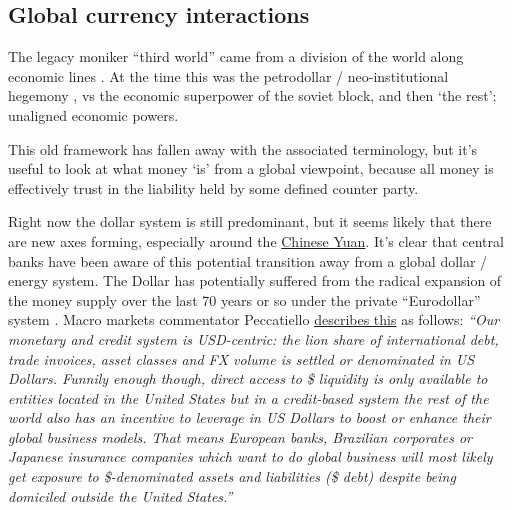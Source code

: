 \subsection{Global currency interactions}
The legacy moniker ``third world'' came from a division of the world along economic lines \cite{tomlinson2003third}. At the time this was the petrodollar / neo-institutional hegemony \cite{caballero2008financial, spiro2019hidden}, vs the economic superpower of the soviet block, and then `the rest'; unaligned economic powers.\par
This old framework has fallen away with the associated terminology, but it's useful to look at what money `is' from a global viewpoint, because all money is effectively trust in the liability held by some defined counter party.\par
Right now the dollar system is still predominant, but it seems likely that there are new axes forming, especially around the \href{https://www.wsj.com/articles/saudi-arabia-considers-accepting-yuan-instead-of-dollars-for-chinese-oil-sales-11647351541}{Chinese Yuan}. It's clear that central banks have been aware of this potential transition away from a global dollar / energy system. The Dollar has potentially suffered from the radical expansion of the money supply over the last 70 years or so under the private ``Eurodollar'' system \cite{grewal2020struggling}. Macro markets commentator Peccatiello \href{https://themacrocompass.substack.com/p/usd-hidden-debt#details}{describes this} as follows: \textit{``Our monetary and credit system is USD-centric: the lion share of international debt, trade invoices, asset classes and FX volume is settled or denominated in US Dollars. Funnily enough though, direct access to \$ liquidity is only available to entities located in the United States but in a credit-based system the rest of the world also has an incentive to leverage in US Dollars to boost or enhance their global business models. That means European banks, Brazilian corporates or Japanese insurance companies which want to do global business will most likely get exposure to \$-denominated assets and liabilities (\$ debt) despite being domiciled outside the United States.''}\par

